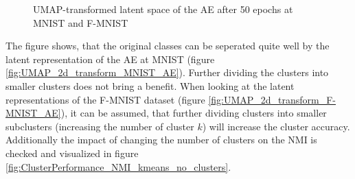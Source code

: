 \documentclass[12pt,DIV14,BCOR12mm,a4paper,footexclude,headinclude,halfparskip-,twoside,openright,cleardoubleempty,idxtotoc,bibtotoc,listtotoc,abstracton]{scrreprt} %
\numberwithin{equation}{chapter}
\begin{document}
	 \begin{figure}[htb!]
		\centering	
		\qquad
		\caption{UMAP-transformed latent space of the AE after 50 epochs at MNIST and F-MNIST}
		\label{fig:UMAP_2d_transform_MNIST_F-MNIST_AE}
	\end{figure}
The figure shows, that the original classes can be seperated quite well by the latent representation of the AE at MNIST (figure \ref{fig:UMAP_2d_transform_MNIST_AE}). Further dividing the clusters into smaller clusters does not bring a benefit. When looking at the latent representations of the F-MNIST dataset (figure \ref{fig:UMAP_2d_transform_F-MNIST_AE}), it can be assumed, that further dividing clusters into smaller subclusters (increasing the number of cluster $k$) will increase the cluster accuracy. Additionally the impact of changing the number of clusters on the NMI is checked and visualized in figure \ref{fig:ClusterPerformance_NMI_kmeans_no_clusters}.
\end{document}
